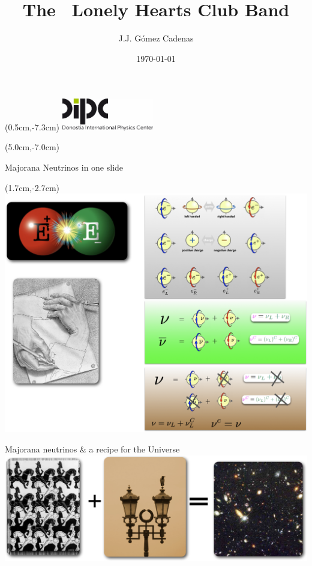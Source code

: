 \documentclass [aspectratio=169]{beamer}
\title[]{\vspace{60pt} \\
The \bbonu\ Lonely Hearts Club Band} %
\author[]{J.J. Gómez Cadenas}
\institute[]{Donostia International Physics Center}
\date{\today}
\begin{document}
{
\begin{frame}
    \titlepage
    \begin{textblock*}{4cm}(0.5cm,-7.3cm)
        \includegraphics[width=4cm]{dipc.png}
    \end{textblock*}
    \begin{textblock*}{8cm}(5.0cm,-7.0cm)
        \huge {} %
    \end{textblock*}
\end{frame}
}

\begin{frame}{Majorana Neutrinos in one slide}
 \begin{textblock*}{4cm}(1.7cm,-2.7cm)
\includegraphics[scale=0.30]{majorananu.png}
 \end{textblock*}

\end{frame}


\begin{frame}{Majorana neutrinos \& a recipe for the Universe}
\includegraphics[scale=0.40]{Universe.png}
\end{frame}
\end{document}
